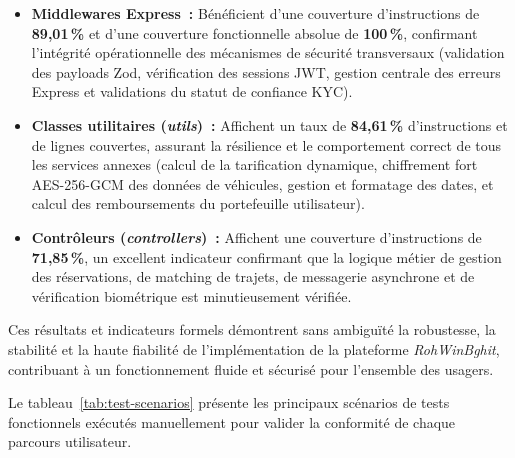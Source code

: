 \begin{itemize}[leftmargin=1.8em]
\begin{itemize}
    \item \textbf{Middlewares Express~:} Bénéficient d'une couverture d'instructions de \textbf{89,01\,\%} et d'une couverture fonctionnelle absolue de \textbf{100\,\%}, confirmant l'intégrité opérationnelle des mécanismes de sécurité transversaux (validation des payloads Zod, vérification des sessions JWT, gestion centrale des erreurs Express et validations du statut de confiance KYC).
    \item \textbf{Classes utilitaires (\textit{utils})~:} Affichent un taux de \textbf{84,61\,\%} d'instructions et de lignes couvertes, assurant la résilience et le comportement correct de tous les services annexes (calcul de la tarification dynamique, chiffrement fort AES-256-GCM des données de véhicules, gestion et formatage des dates, et calcul des remboursements du portefeuille utilisateur).
    \item \textbf{Contrôleurs (\textit{controllers})~:} Affichent une couverture d'instructions de \textbf{71,85\,\%}, un excellent indicateur confirmant que la logique métier de gestion des réservations, de matching de trajets, de messagerie asynchrone et de vérification biométrique est minutieusement vérifiée.
  \end{itemize}
\end{itemize}

Ces résultats et indicateurs formels démontrent sans ambiguïté la robustesse, la stabilité et la haute fiabilité de l'implémentation de la plateforme \textit{RohWinBghit}, contribuant à un fonctionnement fluide et sécurisé pour l'ensemble des usagers.

Le tableau~\ref{tab:test-scenarios} présente les principaux scénarios de tests fonctionnels exécutés manuellement pour valider la conformité de chaque parcours utilisateur.

